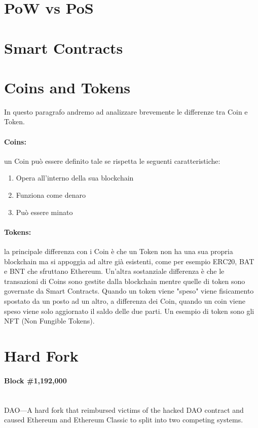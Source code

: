 \section{PoW vs PoS}

\section{Smart Contracts}

\section{Coins and Tokens}
In questo paragrafo andremo ad analizzare brevemente le differenze tra Coin e Token.

\paragraph{Coins:}
un Coin può essere definito tale se rispetta le seguenti caratteristiche:

\begin{enumerate}
      \item Opera all'interno della sua blockchain
      \item Funziona come denaro
      \item Può essere minato
\end{enumerate}

\paragraph{Tokens:}
la principale differenza con i Coin è che un Token non ha una sua propria blockchain
ma si appoggia ad altre già esistenti, come per esempio ERC20, BAT e BNT che
sfruttano Ethereum. Un'altra sostanziale differenza è che le transazioni di Coins
sono gestite dalla blockchain mentre quelle di token sono governate da Smart Contracts.
Quando un token viene "speso" viene fisicamento spostato da un posto ad un altro,
a differenza dei Coin, quando un coin viene speso viene solo aggiornato il saldo
delle due parti. Un esempio di token sono gli NFT (Non Fungible Tokens).

\section{Hard Fork}

\paragraph{Block \#1,192,000} \ \\
DAO—A hard fork that reimbursed victims of the hacked DAO contract and
caused Ethereum and Ethereum Classic to split into two competing systems.

